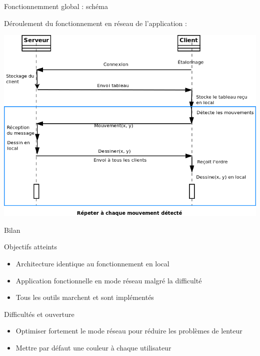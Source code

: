 \documentclass{beamer}
\begin{document}
		\begin{frame}{Fonctionnemment global : schéma}
		
		Déroulement du fonctionnement en réseau de l'application :
			\begin{center}
			\includegraphics[scale=0.40]{../uml/sequence_reseau.png}
			\end{center}
		\end{frame}
		
		\begin{frame}{Bilan}
			\begin{exampleblock}{Objectifs atteints}
				\begin{itemize}
				\item Architecture identique au fonctionnement en local
				\item Application fonctionnelle en mode réseau malgré la difficulté
				\item Tous les outils marchent et sont implémentés
				\end{itemize}
			\end{exampleblock}
			\pause
			\begin{alertblock}{Difficultés et ouverture}
				\begin{itemize}
				\item Optimiser fortement le mode réseau pour réduire les problèmes de lenteur
				\item Mettre par défaut une couleur à chaque utilisateur
				\end{itemize}
			\end{alertblock}
		\end{frame}
\end{document}
